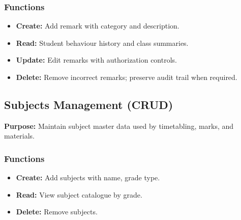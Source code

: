 \documentclass[12pt,a4paper]{article}
\begin{document}
\subsubsection*{Functions}
\begin{itemize}[leftmargin=*]
  \item \textbf{Create:} Add remark with category and description.
  \item \textbf{Read:} Student behaviour history and class summaries.
  \item \textbf{Update:} Edit remarks with authorization controls.
  \item \textbf{Delete:} Remove incorrect remarks; preserve audit trail when required.
\end{itemize}

\subsection{Subjects Management (CRUD)}
\textbf{Purpose:} Maintain subject master data used by timetabling, marks, and materials.

\subsubsection*{Functions}
\begin{itemize}[leftmargin=*]
  \item \textbf{Create:} Add subjects with name, grade  type.
  \item \textbf{Read:} View subject catalogue by grade.
  \item \textbf{Delete:} Remove subjects.
\end{itemize}
\end{document}
